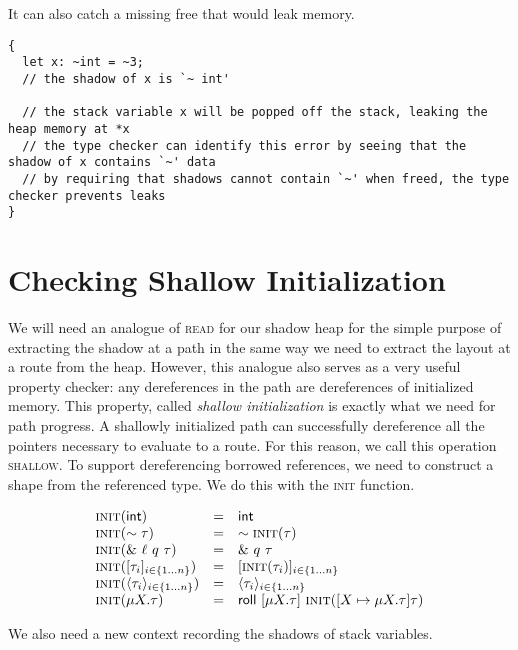 It can also catch a missing free that would leak memory.
\begin{verbatim}
{
  let x: ~int = ~3;
  // the shadow of x is `~ int'

  // the stack variable x will be popped off the stack, leaking the heap memory at *x
  // the type checker can identify this error by seeing that the shadow of x contains `~' data
  // by requiring that shadows cannot contain `~' when freed, the type checker prevents leaks
}
\end{verbatim}

\section*{Checking Shallow Initialization}
We will need an analogue of \textsc{read} for our shadow heap for the
simple purpose of extracting the shadow at a path in the same way we
need to extract the layout at a route from the heap.
However, this analogue also serves as a very useful property checker:
any dereferences in the path are dereferences of initialized memory.
This property, called \emph{shallow initialization} is exactly what we need
for path progress. A shallowly initialized path can successfully dereference
all the pointers necessary to evaluate to a route.
For this reason, we call this operation \textsc{shallow}.
To support dereferencing borrowed references, 
we need to construct a shape from the referenced type.
We do this with the \textsc{init} function.
\newline


\[
\begin{array}{lcl}
\textsc{init}({\mathsf{int}}) &=& \mathsf{int} \\
\textsc{init}({\sim{\tau}}) &=& \sim{\textsc{init}({\tau})} \\
\textsc{init}({\&~{{\ell}~{q}~{\tau}}}) &=& \&~{{q}~{\tau}} \\
\textsc{init}({[{{\tau}_{i}}]_{{i} \in \{1 \ldots {n}\} }}) &=& [\textsc{init}({\tau_i})]_{i \in \{1\ldots n\}} \\
\textsc{init}({\langle{{\tau}_{i}}\rangle_{{i} \in \{1 \ldots {n}\} }}) &=& \langle{{\tau}_{i}}\rangle_{{i} \in \{1 \ldots {n}\} } \\
\textsc{init}({\mu {X}.{\tau}}) &=& \mathsf{roll}~[{\mu {X}.{\tau}}]~{\textsc{init}({[{X} \mapsto {\mu {X}.{\tau}}] {\tau}})} \\
\end{array}
\]

We also need a new context recording the shadows of stack variables.

